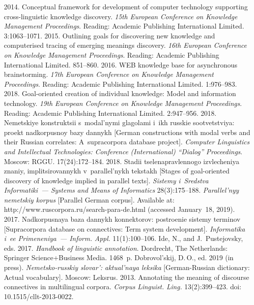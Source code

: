 \begin{multicols}{2}
{{\begin{thebibliography}{99}
    2014. Conceptual framework for development of computer 
technology supporting cross-linguistic knowledge discovery. \textit{15th European 
Conference on Knowledge Management Proceedings}. Reading: Academic 
Publishing International Limited. 3:1063--1071.
   2015. Outlining goals for discovering new 
knowledge and computerised tracing of emerging meanings discovery. \textit{16th 
European Conference on Knowledge Management Proceedings}. Reading: Academic 
Publishing International Limited. 851--860.
   2016.
  WEB knowledge base for asynchronous brainstorming. \textit{17th European 
Conference on Knowledge Management Proceedings}. Reading: Academic 
Publishing International Limited. 1:976--983.
   2018. Goal-oriented creation of individual knowledge: Model 
and information technology. \textit{19th European Conference on Knowledge 
Management Proceedings}. Reading: Academic Publishing International Limited. 
2:947--956.
   2018. Nemetskiye konstruktsii 
s~modal'nymi glagolami i~ikh rus\-skie sootvetstviya: proekt nadkorpusnoy bazy dannykh 
[German constructions with modal verbs and their Russian correlates: A~supracorpora database 
project]. 
\textit{Computer Linguistics and Intellectual Technologies: Conference 
(International) ``Dialog'' Proceedings}. Moscow: RGGU. 17(24):172--184.
   2018. Stadii tselenapravlennogo izvlecheniya znaniy, 
implitsirovannykh v~parallel'nykh tekstakh [Stages of goal-oriented discovery of 
knowledge implied in parallel texts]. \textit{Sistemy i~Sredstva Informatiki~--- 
Systems and Means of Informatics} 28(3):175--188.
  \textit{Parallel'nyy nemetskiy korpus} [Parallel German corpus]. Available at: {\sf 
http://www.ruscorpora.ru/search-para-de.\linebreak html} (accessed January~18, 2019).
   2017. Nadkorpusnaya 
baza dannykh konnektorov: postroenie sistemy terminov [Supracorpora database on 
connectives: Term system development]. \textit{Informatika i~ee Primeneniya~--- 
Inform. Appl.} 11(1):100--106.
  Ide, N., and J.~Pustejovsky, eds. 2017. \textit{Handbook of linguistic annotation}. 
Dordrecht, The Netherlands: Springer Science\;+\;Business Media. 1468~p.
  Dobrovol'skij, D.\,O., ed. 2019 (in press). \textit{Nemetsko-russkiy slovar': 
aktual'naya leksika} [German-Russian dictionary: Actual vocabulary]. Moscow: 
Leksrus.
   2013. Annotating the meaning of discourse 
connectives in multilingual corpora. \textit{Corpus Linguist. Ling.} 
13(2):399--423. doi: 10.1515/cllt-2013-0022.
  \end{thebibliography}

 }
 }

\end{multicols}

